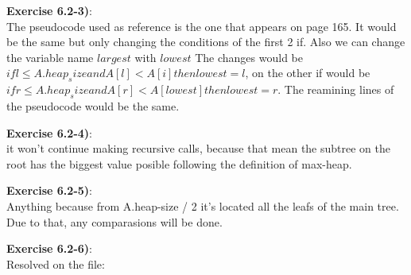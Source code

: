 \documentclass{article}
\newcounter{exercise}[section]   %
\begin{document}
\textbf{Exercise 6.2-3)}:\\
The pseudocode used as reference is the one that appears on page 165.
It would be the same but only changing the conditions of the first 2 if. Also we can change
the variable name \(largest\) with \(lowest\)
The changes would be \(if l \leq A.heap_size and A[l] < A[i] then lowest = l\), on the other
if would be \(if r \leq A.heap_size and A[r] < A[lowest] then lowest = r\). The reamining
lines of the pseudocode would be the same.

\textbf{Exercise 6.2-4)}:\\
it won't continue making recursive calls, because that mean the subtree on the root has the 
biggest value posible following the definition of max-heap.

\textbf{Exercise 6.2-5)}:\\
Anything because from A.heap-size / 2 it's located all the leafs of the main tree. Due to 
that, any comparasions will be done.

\textbf{Exercise 6.2-6)}:\\
Resolved on the file: 
\end{document}
